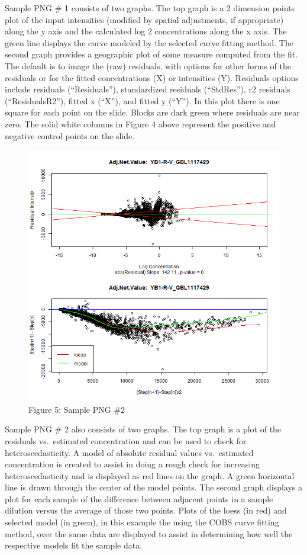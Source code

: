 \documentclass[
]{article}
\begin{document}
Sample PNG \# 1 consists of two graphs. The top graph is a 2 dimension
points plot of the input intensities (modified by spatial adjustments,
if appropriate) along the y axis and the calculated log 2 concentrations
along the x axis. The green line displays the curve modeled by the
selected curve fitting method. The second graph provides a geographic
plot of some measure computed from the fit. The default is to image the
(raw) residuals, with options for other forms of the residuals or for
the fitted concentrations (X) or intensities (Y). Residuals options
include residuals (``Residuals''), standardized residuals (``StdRes''),
r2 residuals (``ResidualsR2''), fitted x (``X''), and fitted y (``Y'').
In this plot there is one square for each point on the slide. Blocks are
dark green where residuals are near zero. The solid white columns in
Figure 4 above represent the positive and negative control points on the
slide.

\begin{figure}
\centering
\includegraphics{images/sample_png_2.png}
\caption{Figure 5: Sample PNG \#2}
\end{figure}

Sample PNG \# 2 also consists of two graphs. The top graph is a plot of
the residuals vs.~estimated concentration and can be used to check for
heteroscedasticity. A model of absolute residual values vs.~estimated
concentration is created to assist in doing a rough check for increasing
heteroscedasticity and is displayed as red lines on the graph. A green
horizontal line is drawn through the center of the model points. The
second graph displays a plot for each sample of the difference between
adjacent points in a sample dilution versus the average of those two
points. Plots of the loess (in red) and selected model (in green), in
this example the using the COBS curve fitting method, over the same data
are displayed to assist in determining how well the respective models
fit the sample data.
\end{document}
